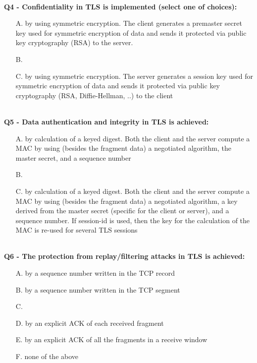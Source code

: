 \textbf{\\Q4 - Confidentiality in TLS is implemented (select one of choices):}
\begin{itemize}
    \item[A.] by using symmetric encryption. The client generates a premaster secret key used for symmetric encryption of data and sends it protected via public key cryptography (RSA) to the server.
    \item[B.] 
    \item[C.] by using symmetric encryption. The server generates a session key used for symmetric encryption of data and sends it protected via public key cryptography (RSA, Diffie-Hellman, ..) to the client
\end{itemize}



\textbf{\\Q5 - Data authentication and integrity in TLS is achieved:}
\begin{itemize}
    \item[A.] by calculation of a keyed digest. Both the client and the server compute a MAC by using (besides the fragment data) a negotiated algorithm, the master secret, and a sequence number
    \item[B.] 
    \item[C.] by calculation of a keyed digest. Both the client and the server compute a MAC by using (besides the fragment data) a negotiated algorithm, a key derived from the master secret (specific for the client or server), and a sequence number. If session-id is used, then the key for the calculation of the MAC is re-used for several TLS sessions
\end{itemize}
\com{}

\textbf{\\Q6 - The protection from replay/filtering attacks in TLS is achieved:}
\begin{itemize}
    \item[A.] by a sequence number written in the TCP record
    \item[B.] by a sequence number written in the TCP segment
    \item[C.] 
    \item[D.] by an explicit ACK of each received fragment
    \item[E.] by an explicit ACK of all the fragments in a receive window
    \item[F.] none of the above
\end{itemize}
\com{}


